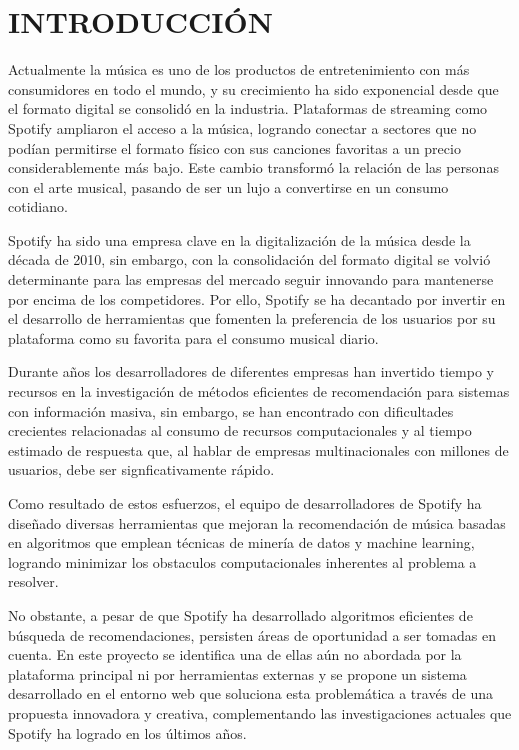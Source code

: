 \chapter*{INTRODUCCIÓN}

\setlength{\parindent}{0pt}      
\setlength{\parskip}{1em}

Actualmente la música es uno de los productos de entretenimiento con más consumidores en todo el mundo, y su crecimiento ha sido exponencial desde que el formato digital se consolidó en la industria. Plataformas de streaming como Spotify ampliaron el acceso a la música, logrando conectar a sectores que no podían permitirse el formato físico con sus canciones favoritas a un precio considerablemente más bajo. Este cambio transformó la relación de las personas con el arte musical, pasando de ser un lujo a convertirse en un consumo cotidiano.



Spotify ha sido una empresa clave en la digitalización de la música desde la década de 2010, sin embargo, con la consolidación del formato digital se volvió determinante para las empresas del mercado seguir innovando para mantenerse por encima de los competidores.
Por ello, Spotify se ha decantado por invertir en el desarrollo de herramientas que fomenten la preferencia de los usuarios por su plataforma como su favorita para el consumo musical diario.


Durante años los desarrolladores de diferentes empresas han invertido tiempo y recursos en la investigación de métodos eficientes de recomendación para sistemas con información masiva, sin embargo, se han encontrado con dificultades crecientes relacionadas al consumo de recursos computacionales y al tiempo estimado de respuesta que, al hablar de empresas multinacionales con millones de usuarios, debe ser signficativamente rápido.


Como resultado de estos esfuerzos, el equipo de desarrolladores de Spotify ha diseñado diversas herramientas que mejoran la recomendación de música basadas en algoritmos que emplean técnicas de minería de datos y machine learning, logrando minimizar los obstaculos computacionales inherentes al problema a resolver.

No obstante, a pesar de que Spotify ha desarrollado algoritmos eficientes de búsqueda de recomendaciones, persisten áreas de oportunidad a ser tomadas en cuenta. En este proyecto se identifica una de ellas aún no abordada por la plataforma principal ni por herramientas externas y se propone un sistema desarrollado en el entorno web que soluciona esta problemática a través de una propuesta innovadora y creativa, complementando las investigaciones actuales que Spotify ha logrado en los últimos años.

